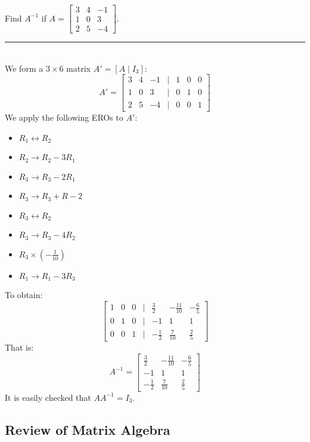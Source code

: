 \documentclass[a4paper, 9pt]{extarticle}
\begin{document}
\begin{examplebox}{}{}
  Find $A^{-1}$ if $A = \begin{bmatrix}
      3 & 4 & -1 \\
      1 & 0 & 3  \\
      2 & 5 & -4
    \end{bmatrix}$.
  \\[2ex] \rule{\textwidth}{1px} \\
  We form a $3 \times 6$ matrix $A' = [A \mid I_3]$:
  $$
    A' = \begin{bmatrix}
      3 & 4 & -1 & | & 1 & 0 & 0 \\
      1 & 0 & 3  & | & 0 & 1 & 0 \\
      2 & 5 & -4 & | & 0 & 0 & 1
    \end{bmatrix}
  $$
  We apply the following EROs to $A'$:
  \begin{itemize}
    \item $R_1 \leftrightarrow R_2$
    \item $R_2 \rightarrow R_2 - 3R_1$
    \item $R_3 \rightarrow R_3 - 2R_1$
    \item $R_3 \rightarrow R_3 + R-2$
    \item $R_3 \leftrightarrow R_2$
    \item $R_3 \rightarrow R_3 - 4R_2$
    \item $R_3 \times (-\frac{1}{10})$
    \item $R_1 \rightarrow R_1 - 3R_3$
  \end{itemize}
  To obtain:
  $$
    \begin{bmatrix}
      1 & 0 & 0 & | & \frac{3}{2}  & -\frac{11}{10} & -\frac{6}{5} \\
      0 & 1 & 0 & | & -1           & 1              & 1            \\
      0 & 0 & 1 & | & -\frac{1}{2} & \frac{7}{10}   & \frac{2}{5}
    \end{bmatrix}
  $$
  That is:
  $$A^{-1} = \begin{bmatrix}
      \frac{3}{2}  & -\frac{11}{10} & -\frac{6}{5} \\
      -1           & 1              & 1            \\
      -\frac{1}{2} & \frac{7}{10}   & \frac{2}{5}
    \end{bmatrix}$$
  It is easily checked that $AA^{-1} = I_3$.
\end{examplebox}
\pagebreak
\subsection{Review of Matrix Algebra}
\end{document}
